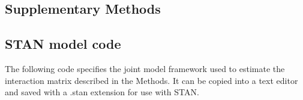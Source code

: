 \documentclass[a4,12pt]{article}
\begin{document}
\begin{itemize}

 



% 
% 

\newpage

\printbibliography   

\newpage 

\section{Supplementary Methods}

    \subsection{STAN model code}

    The following code specifies the joint model framework used to estimate the interaction matrix described in the Methods. It can be copied into a text editor and saved with a .stan extension for use with STAN. 

    



\end{itemize}
\end{document}
